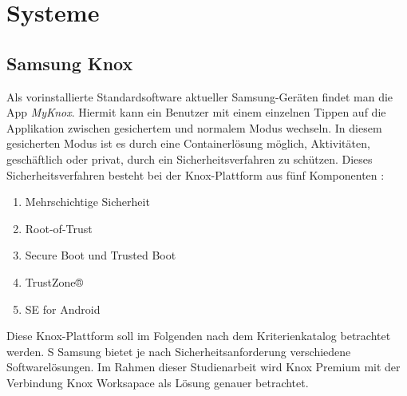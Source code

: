 \chapter{Systeme}
\label{cha:systeme}

\section{Samsung Knox}

Als vorinstallierte Standardsoftware aktueller Samsung-Geräten findet man die App \textit{MyKnox}. Hiermit kann ein Benutzer mit einem einzelnen Tippen auf die Applikation zwischen gesichertem und normalem Modus wechseln. In diesem gesicherten Modus ist es durch eine Containerlösung möglich, Aktivitäten, geschäftlich oder privat, durch ein Sicherheitsverfahren zu schützen. Dieses Sicherheitsverfahren besteht bei der Knox-Plattform aus fünf Komponenten \cite{sam2017}:
\begin{enumerate}
\item Mehrschichtige Sicherheit
\item Root-of-Trust
\item Secure Boot und Trusted Boot
\item TrustZone®
\item SE for Android
\end{enumerate}


  Diese Knox-Plattform soll im Folgenden nach dem Kriterienkatalog betrachtet werden.
S
Samsung bietet je nach Sicherheitsanforderung verschiedene Softwarelösungen. Im Rahmen dieser Studienarbeit wird Knox Premium mit der Verbindung Knox Worksapace als Lösung genauer betrachtet.



